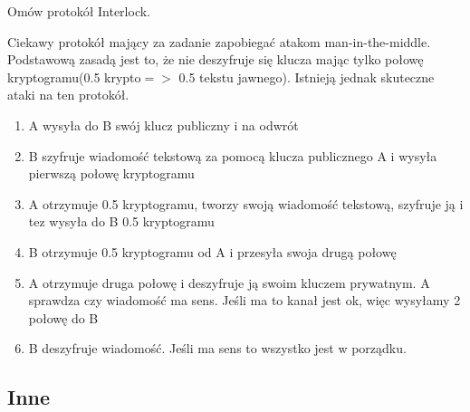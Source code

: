 \documentclass[answers,11pt]{exam}
\begin{document}
\begin{questions}
\question Omów protokół Interlock.
\begin{solution}
Ciekawy protokół mający za zadanie zapobiegać atakom man-in-the-middle. Podstawową zasadą jest to, że nie deszyfruje się klucza mając tylko połowę kryptogramu(0.5 krypto$=>$ 0.5 tekstu jawnego). Istnieją jednak skuteczne ataki na ten protokół.

\begin{enumerate}
\item A wysyła do B swój klucz publiczny i na odwrót
\item B szyfruje wiadomość tekstową za pomocą klucza publicznego A i wysyła pierwszą połowę kryptogramu
\item A otrzymuje 0.5 kryptogramu, tworzy swoją wiadomość tekstową, szyfruje ją i tez wysyła do B 0.5 kryptogramu
\item B otrzymuje 0.5 kryptogramu od A i przesyła swoja drugą połowę
\item A otrzymuje druga połowę i deszyfruje ją swoim kluczem prywatnym. A sprawdza czy wiadomość ma sens. Jeśli ma to kanał jest ok, więc wysyłamy 2 połowę do B
\item B deszyfruje wiadomość. Jeśli ma sens to wszystko jest w porządku.
\end{enumerate}

\end{solution}


\end{questions}


\subsection{Inne}
\end{document}
